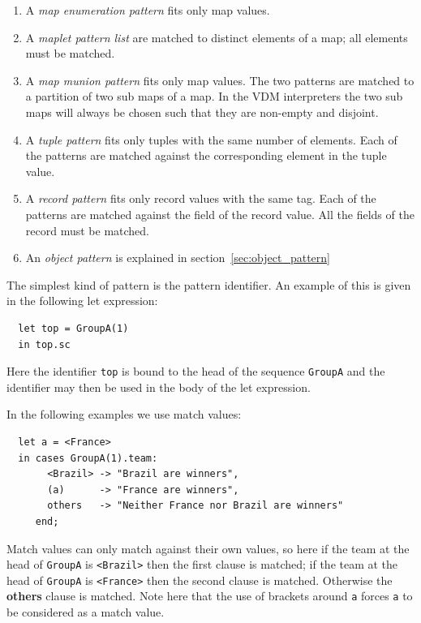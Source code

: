 \documentclass{overturerepchap}
\newcommand{\keyw}[1]{{\bf\ttfamily #1}}
\begin{document}
{\begin{description}
\begin{enumerate}
  \item A {\it map enumeration pattern} fits only map values.

  \item A {\it maplet pattern list} are matched to distinct elements of a map;
   all elements must be matched.

  \item A {\it map munion pattern} fits only map values.
   The two patterns are matched to a partition of two sub maps of a map.
   In the VDM interpreters the two sub maps will always be chosen such that they are non-empty and disjoint.

  \item A {\it tuple pattern} fits only tuples with the same number of
    elements. Each of the patterns are matched against the corresponding
    element in the tuple value.

  \item A {\it record pattern} fits only record values with the same tag.
    Each of the patterns are matched against the field of the record value.
    All the fields of the record must be matched.

  \item An {\it object pattern} is explained in section~\ref{sec:object_pattern}
  \end{enumerate}

\item[Examples:] The simplest kind of pattern is the pattern
identifier. An example of this is given in the following let
expression:
\begin{lstlisting}
  let top = GroupA(1)
  in top.sc
\end{lstlisting}
Here the identifier \texttt{top} is bound to the head of the sequence
\texttt{GroupA} and the identifier may then be used in the body of the
let expression.

In the following examples we use match values:
\begin{lstlisting}
  let a = <France>
  in cases GroupA(1).team:
       <Brazil> -> "Brazil are winners",
       (a)      -> "France are winners",
       others   -> "Neither France nor Brazil are winners"
     end;
\end{lstlisting}
Match values can only match against their own values, so here if the
team at the head of \texttt{GroupA} is \texttt{<Brazil>} then the
first clause is matched; if the team at the head of \texttt{GroupA} is
\texttt{<France>} then the second clause is matched. Otherwise the
\keyw{others} clause is matched. Note here that the use of brackets
around \texttt{a} forces \texttt{a} to be considered as a match value.


\end{description}}
\end{document}
